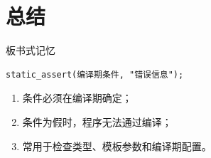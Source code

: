 \documentclass[UTF8,12pt,a4paper]{ctexart}
\begin{document}
\section{总结}
\begin{conceptbox}{板书式记忆}
\begin{lstlisting}
static_assert(编译期条件, "错误信息");
\end{lstlisting}
\begin{enumerate}[label=\arabic*.]
    \item 条件必须在编译期确定；
    \item 条件为假时，程序无法通过编译；
    \item 常用于检查类型、模板参数和编译期配置。
\end{enumerate}
\end{conceptbox}
\end{document}
